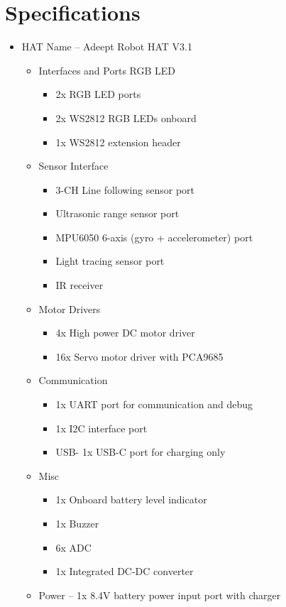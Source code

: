 \documentclass{article}
\begin{document}
	\section{Specifications}
	\begin{itemize}
		\item HAT Name – Adeept Robot HAT V3.1
		\begin{itemize}
			\item Interfaces and Ports
			RGB LED
			\begin{itemize}
				\item 2x RGB LED ports
				\item 2x WS2812 RGB LEDs onboard 
				\item 1x WS2812 extension header
				
			\end{itemize}
			
			\item Sensor Interface
			\begin{itemize}
				\item 3-CH Line following sensor port
				\item Ultrasonic range sensor port
				\item 	MPU6050 6-axis (gyro + accelerometer) port
				\item Light tracing sensor port
				\item IR receiver
			\end{itemize}
			
			\item Motor Drivers
			\begin{itemize}
				\item 4x High power DC motor driver
				\item 16x Servo motor driver with PCA9685
			\end{itemize}
			
			
			\item Communication
			\begin{itemize}
				\item 1x UART port for communication and debug
				\item 1x I2C interface port
				\item USB- 1x USB-C port for charging only
			\end{itemize}
			
			
			
			\item Misc
			\begin{itemize}
				\item 1x Onboard battery level indicator
				\item 1x Buzzer
				\item 6x ADC
				\item 1x Integrated DC-DC converter
			\end{itemize}
			\item Power – 1x 8.4V battery power input port with charger
		\end{itemize}
	\end{itemize}	
	
\end{document}
